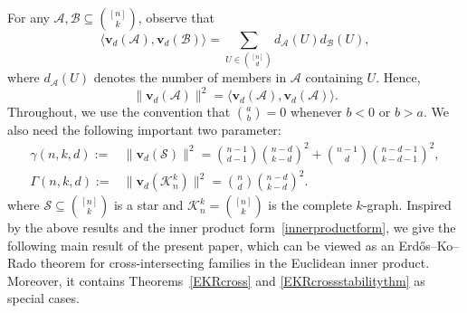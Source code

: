 \documentclass[11pt]{article}
\numberwithin{equation}{section}
\def\A{\mathcal{A}}
\def\B{\mathcal{B}}
\def\S{\mathcal{S}}
\begin{document}
For any $\A,\B\subseteq \binom{[n]}{k}$, observe that
\begin{equation}\label{innerproductform}
\big\langle \mathbf{v}_d(\A),\mathbf{v}_d(\B)\big\rangle
=\sum_{U\in \binom{[n]}{d}}
d_{\A}(U) d_{\B}(U),
\end{equation}
where $d_\mathcal{\A}(U)$ denotes the number of members in $\A$ containing $U$.
Hence,
\[
\|\mathbf{v}_{d}(\A)\|^2
=\big\langle\mathbf{v}_d(\A),\mathbf{v}_d(\A)\big\rangle.
\]
Throughout, we use the convention that $\binom{a}{b}=0$ whenever
$b<0$ or $b>a$.
We also need the following important two parameter:
\begin{align*}
\gamma(n,k,d):=&\|\mathbf{v}_{d}(\S)\|^2=
\binom{n-1}{d-1}\binom{n-d}{k-d}^{2}
+\binom{n-1}{d}\binom{n-d-1}{k-d-1}^{2},\\
\Gamma(n,k,d):= &\|\mathbf{v}_{d}(\mathcal{K}_n^k)\|^2=
\binom {n}{d}\binom{n-d}{k-d}^{2}.
\end{align*}
where $\S\subseteq \binom{[n]}{k}$ is a star and $\mathcal{K}_n^k=\binom{[n]}{k}$ is  the complete $k$-graph.
Inspired by the above results and the inner product form~\eqref{innerproductform},
we give the following main result of the present paper,
which can be viewed as an Erd\H{o}s--Ko--Rado theorem for cross-intersecting families in the Euclidean inner product.
Moreover, it contains Theorems~\ref{EKRcross} and \ref{EKRcrossstabilitythm} as special cases.
\end{document}
